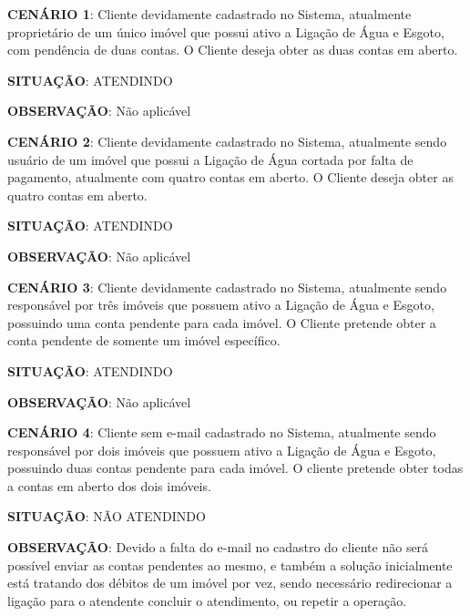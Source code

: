 \begin{flushleft}
\begin{description}
\item \textbf{CENÁRIO 1}: Cliente devidamente cadastrado no Sistema, atualmente proprietário de um único imóvel que possui ativo a Ligação de Água e Esgoto, com pendência de duas contas. O Cliente deseja obter as duas contas em aberto.
\item \textbf{SITUAÇÃO}: ATENDINDO
\item \textbf{OBSERVAÇÃO}: Não aplicável
\end{description}

\begin{description}
\item \textbf{CENÁRIO 2}: Cliente devidamente cadastrado no Sistema, atualmente sendo usuário de um imóvel que possui a Ligação de Água cortada por falta de pagamento, atualmente com quatro contas em aberto. O Cliente deseja obter as quatro contas em aberto.
\item \textbf{SITUAÇÃO}: ATENDINDO
\item \textbf{OBSERVAÇÃO}: Não aplicável
\end{description}

\begin{description}
\item \textbf{CENÁRIO 3}: Cliente devidamente cadastrado no Sistema, atualmente sendo responsável por três imóveis que possuem ativo a Ligação de Água e Esgoto, possuindo uma conta pendente para cada imóvel. O Cliente pretende obter a conta pendente de somente um imóvel específico. 
\item \textbf{SITUAÇÃO}: ATENDINDO
\item \textbf{OBSERVAÇÃO}: Não aplicável
\end{description}

\begin{description}
\item \textbf{CENÁRIO 4}: Cliente sem e-mail cadastrado no Sistema, atualmente sendo responsável por dois imóveis que possuem ativo a Ligação de Água e Esgoto, possuindo duas contas pendente para cada imóvel.  O cliente pretende obter todas a contas em aberto dos dois imóveis. 
\item \textbf{SITUAÇÃO}: NÃO ATENDINDO
\item \textbf{OBSERVAÇÃO}: Devido a falta do e-mail no cadastro do cliente não será possível enviar as contas pendentes ao mesmo, e também a solução inicialmente está tratando dos débitos de um imóvel por vez, sendo necessário redirecionar a ligação para o atendente concluir o atendimento, ou repetir a operação.
\end{description}
\end{flushleft}


